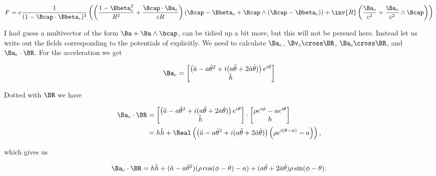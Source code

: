 {\begin{equation}\label{eqn:relativisticElectrodynamicsExamReflection:935}
F = 
e \frac{1}{(1 - \Rcap \cdot \Bbeta_c)^3}
\left(
\left(
\frac{1 - \Bbeta_c^2}{R^2} + \frac{\Rcap \cdot \Ba_c}{c R}
\right)
\left(
\Rcap - \Bbeta_c + \Rcap \wedge (\Rcap - \Bbeta_c)
\right)
+ \inv{R} \left( 
\frac{\Ba_c}{c^2}
+ \frac{\Ba_c}{c^2} \wedge \Rcap
\right)
\right)
\end{equation}

I had guess a multivector of the form $\Ba + \Ba \wedge \bcap$, can be tidied up a bit more, but this will not be persued here.  Instead let us write out the fields corresponding to the potentials of  explicitly.  We need to calculate $\Ba_c$, $\Bv_c \cross \BR$, $\Ba_c \cross \BR$, and $\Ba_c \cdot \BR$.  For the acceleration we get

\begin{equation}\label{eqn:relativisticElectrodynamicsExamReflection:940}
\Ba_c =
\begin{bmatrix}
\left( \ddot{a} - a {\dot{\theta}}^2 + i ( a\ddot{\theta} + 2 \dot{a} \dot{\theta} ) \right) e^{i\theta} \\
\ddot{h}
\end{bmatrix}
\end{equation}

Dotted with $\BR$ we have

\begin{equation}\label{eqn:relativisticElectrodynamicsExamReflection:1290}
\begin{aligned}
\Ba_c \cdot \BR
&=
\begin{bmatrix}
\left( \ddot{a} - a {\dot{\theta}}^2 + i ( a\ddot{\theta} + 2 \dot{a} \dot{\theta} ) \right) e^{i\theta} \\
\ddot{h}
\end{bmatrix}
\cdot 
\begin{bmatrix}
\rho e^{i\phi} - a e^{i\theta} \\
h
\end{bmatrix} \\
&=
h \ddot{h} + \Real\left( 
\left( \ddot{a} - a {\dot{\theta}}^2 + i ( a\ddot{\theta} + 2 \dot{a} \dot{\theta} ) \right) \left(\rho e^{i(\theta- \phi)} - a\right)
\right) ,
\end{aligned}
\end{equation}

which gives us

\begin{equation}\label{eqn:relativisticElectrodynamicsExamReflection:950}
\Ba_c \cdot \BR =
h \ddot{h} + 
( \ddot{a} - a {\dot{\theta}}^2 ) (\rho \cos(\phi - \theta) - a)
+ (a \ddot{\theta} + 2 \dot{a} \dot{\theta}) \rho \sin(\phi - \theta).
\end{equation}

}
